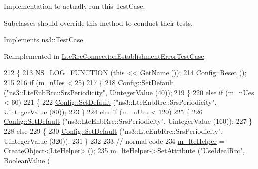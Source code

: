 Implementation to actually run this Test\+Case. 

Subclasses should override this method to conduct their tests. 

Implements \hyperlink{classns3_1_1TestCase_a8ff74680cf017ed42011e4be51917a24}{ns3\+::\+Test\+Case}.



Reimplemented in \hyperlink{classLteRrcConnectionEstablishmentErrorTestCase_adaffd410f878c9af5d8d4df0db31eeee}{Lte\+Rrc\+Connection\+Establishment\+Error\+Test\+Case}.


\begin{DoxyCode}
212 \{
213   \hyperlink{log-macros-disabled_8h_a90b90d5bad1f39cb1b64923ea94c0761}{NS\_LOG\_FUNCTION} (\textcolor{keyword}{this} << \hyperlink{classns3_1_1TestCase_a28f7bb59669c24dae1c290fc17fc9b62}{GetName} ());
214   \hyperlink{group__config_ga2c1b65724f42f8c72276d7e7ad6df6db}{Config::Reset} ();
215 
216   \textcolor{keywordflow}{if} (\hyperlink{classLteRrcConnectionEstablishmentTestCase_a402354f3bb0e71f08f711f4f27cd8fd4}{m\_nUes} < 25)
217     \{
218       \hyperlink{group__config_ga2e7882df849d8ba4aaad31c934c40c06}{Config::SetDefault} (\textcolor{stringliteral}{"ns3::LteEnbRrc::SrsPeriodicity"}, UintegerValue (40));
219     \}
220   \textcolor{keywordflow}{else} \textcolor{keywordflow}{if} (\hyperlink{classLteRrcConnectionEstablishmentTestCase_a402354f3bb0e71f08f711f4f27cd8fd4}{m\_nUes} < 60)
221     \{
222       \hyperlink{group__config_ga2e7882df849d8ba4aaad31c934c40c06}{Config::SetDefault} (\textcolor{stringliteral}{"ns3::LteEnbRrc::SrsPeriodicity"}, UintegerValue (80));
223     \}
224   \textcolor{keywordflow}{else} \textcolor{keywordflow}{if} (\hyperlink{classLteRrcConnectionEstablishmentTestCase_a402354f3bb0e71f08f711f4f27cd8fd4}{m\_nUes} < 120)
225     \{
226       \hyperlink{group__config_ga2e7882df849d8ba4aaad31c934c40c06}{Config::SetDefault} (\textcolor{stringliteral}{"ns3::LteEnbRrc::SrsPeriodicity"}, UintegerValue (160));
227     \}
228   \textcolor{keywordflow}{else}
229     \{
230       \hyperlink{group__config_ga2e7882df849d8ba4aaad31c934c40c06}{Config::SetDefault} (\textcolor{stringliteral}{"ns3::LteEnbRrc::SrsPeriodicity"}, UintegerValue (320));
231     \}
232 
233   \textcolor{comment}{// normal code}
234   \hyperlink{classLteRrcConnectionEstablishmentTestCase_a8b3adef98e6fbb2d1a88c98aba524a4e}{m\_lteHelper} = CreateObject<LteHelper> ();
235   \hyperlink{classLteRrcConnectionEstablishmentTestCase_a8b3adef98e6fbb2d1a88c98aba524a4e}{m\_lteHelper}->\hyperlink{classns3_1_1ObjectBase_ac60245d3ea4123bbc9b1d391f1f6592f}{SetAttribute} (\textcolor{stringliteral}{"UseIdealRrc"}, \hyperlink{classns3_1_1BooleanValue}{BooleanValue} (

\end{DoxyCode}
